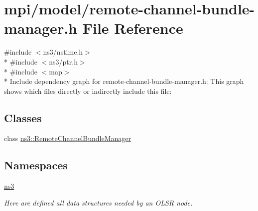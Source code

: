 \hypertarget{remote-channel-bundle-manager_8h}{}\section{mpi/model/remote-\/channel-\/bundle-\/manager.h File Reference}
\label{remote-channel-bundle-manager_8h}
{\ttfamily \#include $<$ns3/nstime.\+h$>$}\\*
{\ttfamily \#include $<$ns3/ptr.\+h$>$}\\*
{\ttfamily \#include $<$map$>$}\\*
Include dependency graph for remote-\/channel-\/bundle-\/manager.h\+:
This graph shows which files directly or indirectly include this file\+:
\subsection*{Classes}
\begin{DoxyCompactItemize}
\item 
class \hyperlink{classns3_1_1RemoteChannelBundleManager}{ns3\+::\+Remote\+Channel\+Bundle\+Manager}
\end{DoxyCompactItemize}
\subsection*{Namespaces}
\begin{DoxyCompactItemize}
\item 
 \hyperlink{namespacens3}{ns3}
\begin{DoxyCompactList}\small\item\em Here are defined all data structures needed by an O\+L\+SR node. \end{DoxyCompactList}\end{DoxyCompactItemize}
